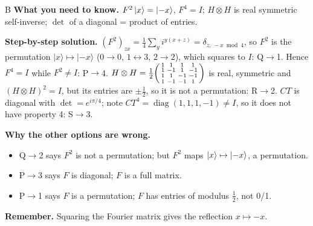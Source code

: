 \documentclass[11pt,a4paper]{article}
\newcommand{\qsep}{\par\vspace{2pt}{\color{black!15}\hrule}\vspace{4pt}}
\begin{document}
\begin{solbox}{B}
\textbf{\color{brand}What you need to know.} $F^2\ket{x} = \ket{-x}$, $F^4 = I$; $H\otimes H$ is real symmetric self-inverse; $\det$ of a diagonal = product of entries.

\textbf{\color{brand}Step-by-step solution.} $(F^2)_{zx} = \frac14\sum_y i^{y(x+z)} = \delta_{z,\,-x \bmod 4}$, so $F^2$ is the permutation $|x\rangle \mapsto |{-x}\rangle$
($0\to0$, $1\leftrightarrow3$, $2\to2$), which squares to $I$: Q$\to$1. Hence $F^4 = I$ while $F^2 \neq I$: P$\to$4.
$H\otimes H = \frac12\begin{psmallmatrix}1&1&1&1\\1&-1&1&-1\\1&1&-1&-1\\1&-1&-1&1\end{psmallmatrix}$ is real, symmetric and
$(H\otimes H)^2 = I$, but its entries are $\pm\frac12$, so it is not a permutation: R$\to$2.
$CT$ is diagonal with $\det = e^{i\pi/4}$; note $CT^4 = \operatorname{diag}(1,1,1,-1) \neq I$, so it does not have property 4: S$\to$3.

\textbf{\color{brand}Why the other options are wrong.}
\begin{itemize}[leftmargin=2.4em, itemsep=1pt, topsep=2pt]
\item[\textbf{(A)}] Q$\to$2 says $F^2$ is not a permutation; but $F^2$ maps $\ket{x}\mapsto\ket{-x}$, a permutation.
\item[\textbf{(C)}] P$\to$3 says $F$ is diagonal; $F$ is a full matrix.
\item[\textbf{(D)}] P$\to$1 says $F$ is a permutation; $F$ has entries of modulus $\frac12$, not 0/1.
\end{itemize}
\textbf{\color{brand}Remember.} Squaring the Fourier matrix gives the reflection $x \mapsto -x$.
\end{solbox}
\qsep
\end{document}
